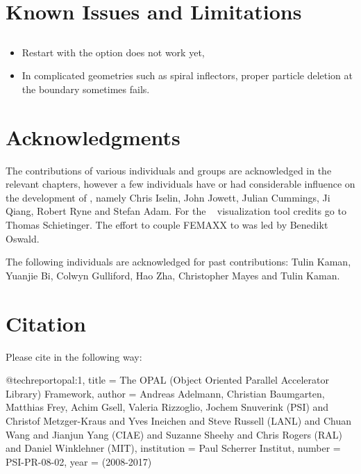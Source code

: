 \section{Known Issues and Limitations}
\subsection{\opalcycl}
\begin{itemize}
    \item Restart with the option  does not work yet,
    \item In complicated geometries such as spiral inflectors, proper particle deletion at the boundary sometimes fails.
\end{itemize}
\section{Acknowledgments}
The contributions of various individuals and groups are acknowledged in the relevant chapters, however a few individuals have or had considerable influence on the
development of \opal, namely Chris Iselin, John Jowett, Julian Cummings, Ji Qiang, Robert Ryne and Stefan Adam. For the \partroot~ visualization tool credits go to Thomas Schietinger.
The effort to couple FEMAXX to \opal was led by Benedikt Oswald.

The following
individuals are acknowledged for past contributions: Tulin Kaman, Yuanjie Bi, Colwyn Gulliford, Hao Zha, Christopher Mayes and Tulin Kaman.

\section{Citation}
Please cite \opal in the following way:
\begin{example}
@techreport{opal:1,
title = {The OPAL (Object Oriented Parallel Accelerator Library) Framework},
author = {Andreas Adelmann, Christian Baumgarten, Matthias Frey, Achim Gsell, Valeria Rizzoglio, 
Jochem Snuverink (PSI) and Christof Metzger-Kraus and Yves Ineichen and 
Steve Russell (LANL) and Chuan Wang and Jianjun Yang (CIAE) and 
Suzanne Sheehy and Chris Rogers (RAL) and
Daniel Winklehner (MIT)},
institution = {Paul Scherrer Institut},
number = {PSI-PR-08-02},
year = {(2008-2017)}
}
\end{example}



